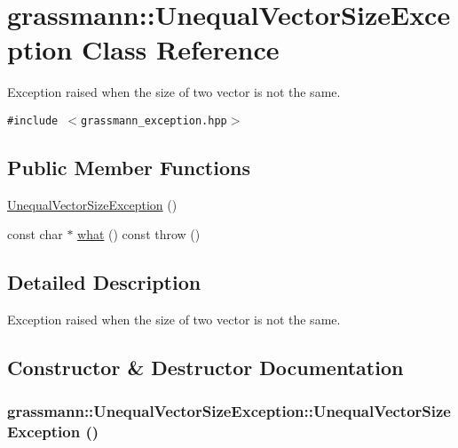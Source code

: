 \hypertarget{classgrassmann_1_1UnequalVectorSizeException}{
\section{grassmann::UnequalVectorSizeException Class Reference}
\label{classgrassmann_1_1UnequalVectorSizeException}
}
Exception raised when the size of two vector is not the same.  


{\tt \#include $<$grassmann\_\-exception.hpp$>$}

\subsection*{Public Member Functions}
\begin{CompactItemize}
\item 
\hyperlink{classgrassmann_1_1UnequalVectorSizeException_e5f6b203bdaf5c28474b2b61ac5d0fcc}{UnequalVectorSizeException} ()
\item 
const char $\ast$ \hyperlink{classgrassmann_1_1UnequalVectorSizeException_59c3b028a8afe8b6b62d0cb7dfa10dbe}{what} () const   throw ()
\end{CompactItemize}


\subsection{Detailed Description}
Exception raised when the size of two vector is not the same. 

\subsection{Constructor \& Destructor Documentation}
\hypertarget{classgrassmann_1_1UnequalVectorSizeException_e5f6b203bdaf5c28474b2b61ac5d0fcc}{
\subsubsection[UnequalVectorSizeException]{\setlength{\rightskip}{0pt plus 5cm}grassmann::UnequalVectorSizeException::UnequalVectorSizeException ()}}
\label{classgrassmann_1_1UnequalVectorSizeException_e5f6b203bdaf5c28474b2b61ac5d0fcc}




